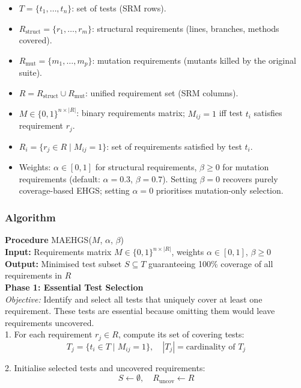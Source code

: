 \begin{appendices}
\begin{itemize}
  \item $T = \{t_1,\dots,t_n\}$: set of tests (SRM rows).
  \item $R_{\text{struct}} = \{r_1,\dots,r_m\}$: structural requirements (lines, branches, methods covered).
  \item $R_{\text{mut}} = \{m_1,\dots,m_p\}$: mutation requirements (mutants killed by the original suite).
  \item $R = R_{\text{struct}} \cup R_{\text{mut}}$: unified requirement set (SRM columns).
  \item $M \in \{0,1\}^{n \times |R|}$: binary requirements matrix; $M_{ij} = 1$ iff test $t_i$ satisfies requirement $r_j$.
  \item $R_i = \{r_j \in R \mid M_{ij}=1\}$: set of requirements satisfied by test $t_i$.
  \item Weights: $\alpha \in [0,1]$ for structural requirements, $\beta \ge 0$ for mutation requirements (default: $\alpha = 0.3$, $\beta = 0.7$). Setting $\beta = 0$ recovers purely coverage-based EHGS; setting $\alpha = 0$ prioritises mutation-only selection.
\end{itemize}

\subsubsection*{Algorithm}

\begin{framed}
\noindent\textbf{Procedure} MAEHGS($M$, $\alpha$, $\beta$)\\
\textbf{Input:} Requirements matrix $M \in \{0,1\}^{n \times |R|}$, weights $\alpha \in [0,1]$, $\beta \ge 0$\\
\textbf{Output:} Minimised test subset $S \subseteq T$ guaranteeing 100\% coverage of all requirements in $R$\\[4pt]

\noindent\textbf{Phase 1: Essential Test Selection}\\
\emph{Objective:} Identify and select all tests that uniquely cover at least one requirement. These tests are essential because omitting them would leave requirements uncovered.\\[4pt]

1. For each requirement $r_j \in R$, compute its set of covering tests:
\[
  T_j = \{ t_i \in T \mid M_{ij} = 1 \}, \quad |T_j| = \text{cardinality of }T_j
\]

2. Initialise selected tests and uncovered requirements:
\[
  S \leftarrow \emptyset,\quad R_{\text{uncov}} \leftarrow R
\]


\end{framed}
\end{appendices}
